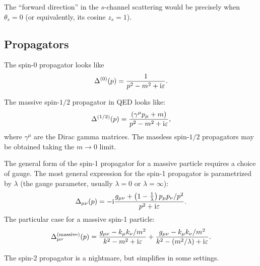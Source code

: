 \begin{remark}
The ``forward direction'' in the $s$-channel scattering would be
precisely when $\theta_{s}=0$ (or equivalently, its cosine $z_{s}=1$).
\end{remark}

\subsection{Propagators}

The spin-0 propagator looks like
\begin{equation}
\Delta^{(0)}(p) = \frac{1}{p^{2} - m^{2} + \mathrm{i}\varepsilon}.
\end{equation}


The massive spin-$1/2$ propagator in QED looks like:
\begin{equation}
\Delta^{(1/2)}(p) = \frac{(\gamma^{\mu}p_{\mu}+m)}{p^{2}-m^{2}+\mathrm{i}\varepsilon},
\end{equation}
where $\gamma^{\mu}$ are the Dirac gamma matrices. The massless
spin-$1/2$ propagators may be obtained taking the $m\to0$ limit.

The general form of the spin-1 propagator for a massive particle
requires a choice of gauge. The most general expression for the spin-1
propagator is parametrized by $\lambda$ (the gauge parameter, usually
$\lambda=0$ or $\lambda=\infty$):
\begin{equation}
\Delta_{\mu\nu}(p) = -\mathrm{i}\frac{g_{\mu\nu} + \left(1 - \frac{1}{\lambda}\right)p_{\mu}p_{\nu}/p^{2}}{p^{2}+\mathrm{i}\varepsilon}.
\end{equation}
The particular case for a massive spin-1 particle:
\begin{equation}
\Delta^{\text{(massive)}}_{\mu\nu}(p) = \frac{g_{\mu\nu} - k_{\mu}k_{\nu}/m^{2}}{k^{2}-m^{2}+\mathrm{i}\varepsilon}
+\frac{g_{\mu\nu} - k_{\mu}k_{\nu}/m^{2}}{k^{2}-(m^{2}/\lambda)+\mathrm{i}\varepsilon}.
\end{equation}

The spin-2 propagator is a nightmare, but simplifies in some settings.

